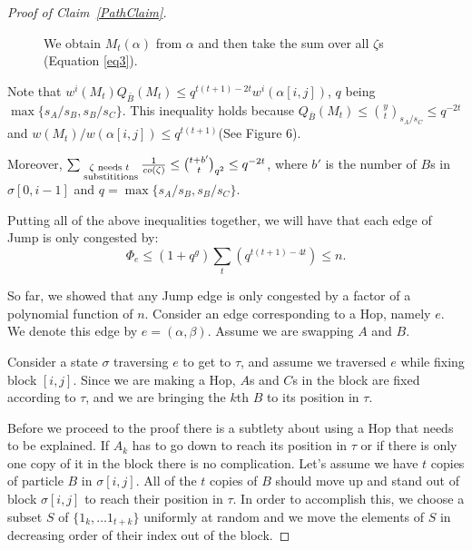 \documentclass[10 pt]{article}
\begin{document}
\begin{proof}[Proof of Claim~\ref{PathClaim}]
\begin{figure}[!ht]

\centerline{}

\caption{We obtain $M_t(\alpha)$ from $\alpha$ and then take the sum over all $\zeta$s (Equation \ref{eq3}). }
\end{figure}\label{fig6}
\smallskip
Note that $w^i(M_t)Q_{\bar{B}}(M_t)\leq q^{t(t+1)-2t} w^i(\alpha[i,j])$,  $q$ being $\max\{s_A/s_B,s_B/s_C\}$.
This inequality holds because $Q_{\bar{B}}(M_t)\leq {{y}\choose{t}}_{s_A/s_C}\leq q^{-2t} $ and $w(M_t)/ w(\alpha[i,j])\leq
q^{t(t+1)}$(See Figure 6).

Moreover, $ \sum_{\substack{\zeta \text{ needs }t \\\text{ substititions}}}\frac{1} {\emph{co}(\zeta)}\leq
{{t+b'}\choose{t}}_{q^2}\leq q^{-2t} $, where $b'$ is the number of $B$s in $\sigma[0,i-1]$ and $q=\max\{s_A/s_B, s_B/s_C\}$.

\smallskip
Putting all of the above inequalities together, we will have that each edge of Jump is only congested by:
$$\Phi_e\leq (1+q^g)\sum_t (q^{t(t+1)-4t})\leq n.$$


So far, we showed that any Jump edge is only congested by a factor of a polynomial function of $n$. 
Consider  an edge corresponding to a Hop, namely $e$. We denote this edge by $e=(\alpha,\beta)$. Assume we are swapping $A$ and $B$.

\medskip

Consider a state $\sigma$ traversing $e$ to get to $\tau$, and assume we traversed $e$ while fixing block $[i,j]$.
Since we are making a Hop,  $A$s and $C$s in the block are fixed according to $\tau$, and we are  bringing the $k$th  $B$ to its position in $\tau$.

\medskip

Before we proceed to the proof there is a subtlety about using a Hop that needs to be explained. If $A_k$ has to go down to reach
its position in $\tau$  or if there is only one copy of it in the block there is no complication. 
Let's assume we have $t$ copies of particle $B$ in $\sigma[i,j]$. All of the $t$ copies of $B$ should move up and stand out
of block $\sigma[i,j]$ to reach their position in $\tau$. In order to accomplish this, we choose a subset $S$ of
$\{1_k,\dots 1_{t{+}k}\}$ uniformly at random and we move the elements of $S$ in decreasing order of their index out of the block.  

\smallskip


\end{proof}
\end{document}
